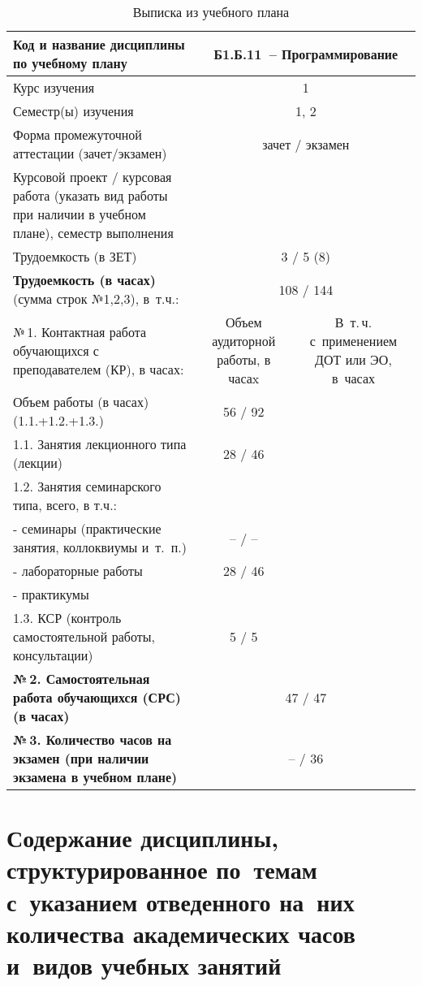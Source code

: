 \documentclass[a4paper,12pt]{article}
\begin{document}
\begin{table}[H]
\caption{Выписка из учебного плана} 
\begin{tabular}{|p{9cm}|c|c|}
\hline
Код и название дисциплины по учебному плану & \multicolumn{2}{p{6cm}|}{Б1.Б.11\ -- Программирование }\\
\hline
Курс изучения &\multicolumn{2}{c|}{ 1 }\\
\hline
Семестр(ы) изучения &\multicolumn{2}{c|}{ 1, 2 }\\
\hline
Форма промежуточной аттестации (зачет/экзамен) &\multicolumn{2}{c|}{ зачет / экзамен }\\
\hline
Курсовой проект / курсовая работа (указать вид работы при наличии в учебном плане), семестр выполнения &\multicolumn{2}{c|}{ }\\
\hline
Трудоемкость (в ЗЕТ) &\multicolumn{2}{c|}{ 3 / 5 (8) }\\
\hline
{\bf Трудоемкость (в часах)} (сумма строк №1,2,3), в~т.ч.:& \multicolumn{2}{c|}{108 / 144}\\
\hline
№\,1. Контактная работа обучающихся с преподавателем (КР), в часах:
& \multicolumn{1}{p{3cm}|}{\centering Объем аудиторной работы, в часаx}
& \multicolumn{1}{p{3cm}|}{\centering\arraybackslash В~т.\,ч. с~применением ДОТ или ЭО, в~часах}\\
\hline
Объем работы (в часах) (1.1.+1.2.+1.3.)& 56 / 92 & \\
\hline
1.1. Занятия лекционного типа (лекции) & 28 / 46 & \\
\hline
1.2. Занятия семинарского типа, всего, в т.ч.: & & \\
\hline
- семинары (практические занятия, коллоквиумы и~т.~п.)  & – / – & \\
\hline
- лабораторные работы& 28 / 46 & \\
\hline
- практикумы & & \\
\hline
1.3. КСР (контроль самостоятельной работы, консультации)& 5 / 5 & \\
\hline
{\bf №\,2. Самостоятельная работа обучающихся (СРС) (в часах)}& \multicolumn{2}{c|}{47 / 47}\\
\hline
{\bf №\,3. Количество часов на экзамен (при наличии экзамена в учебном плане)}& \multicolumn{2}{c|}{– / 36}\\
\hline
\end{tabular}
\end{table}

\newpage
\section{Содержание дисциплины, структурированное по~темам с~указанием отведенного на~них количества академических часов и~видов учебных занятий}
\end{document}
